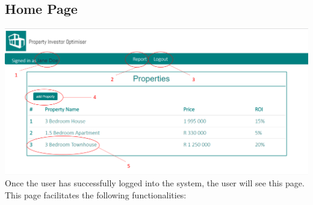 \documentclass[a4paper,12pt]{article}
\begin{document}
\subsection{Home Page}
		\includegraphics[width=0.9\linewidth, center]{./System/Home.PNG}\\[0.4cm]  
Once the user has successfully logged into the system, the user will see this page. This page facilitates the following functionalities:
\end{document}
